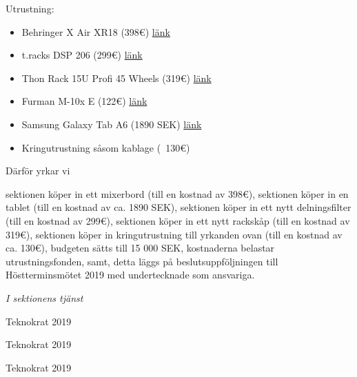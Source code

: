 \documentclass[../_main/handlingar.tex]{subfiles}
\begin{document}
    Utrustning: 
    \begin{itemize}
        \item Behringer X Air XR18 (398\euro)           \href{https://www.thomann.de/se/behringer_x_air_xr18.htm}{länk}
        \item t.racks DSP 206 (299\euro)                \href{https://www.thomann.de/se/the_t.racks_dsp_206.htm}{länk}
        \item Thon Rack 15U Profi 45 Wheels (319\euro) \href{https://www.thomann.de/se/thon_rack_15he_pro_live45_m_rollen.htm}{länk}
        \item Furman M-10x E (122\euro)                 \href{https://www.thomann.de/se/furman_m10x_e.htm}{länk}
        \item Samsung Galaxy Tab A6 (1890 SEK)          \href{https://www.netonnet.se/art/dator/surfplattor/samsung-galaxy-tab-a-10-1-2016-wifi-32gb-white/1002419.8899}{länk}
        \item Kringutrustning såsom kablage (~130\euro)
    \end{itemize}




    Därför yrkar vi 
    \begin{attsatser}
       \att sektionen köper in ett mixerbord (till en kostnad av 398\euro),
        \att sektionen köper in en tablet (till en kostnad av ca. 1890 SEK),
       \att sektionen köper in ett nytt delningsfilter (till en kostnad av 299\euro),
       \att sektionen köper in ett nytt rackskåp (till en kostnad av 319\euro),
       \att sektionen köper in kringutrustning till yrkanden ovan (till en kostnad av ca. 130\euro),
       \att budgeten sätts till 15 000 SEK,
       \att kostnaderna belastar utrustningsfonden, samt, 
       \att detta läggs på beslutsuppföljningen till Höstterminsmötet 2019 med undertecknade som ansvariga.

      \end{attsatser}




\begin{signatures}{3}
        \textit{I  sektionens tjänst}
        \signature{David Karlsson}{Teknokrat 2019}
        \signature{Emil P. Lundh}{Teknokrat 2019}
        \signature{Moa Rönnlund}{Teknokrat 2019}
    \end{signatures}
\end{document}
